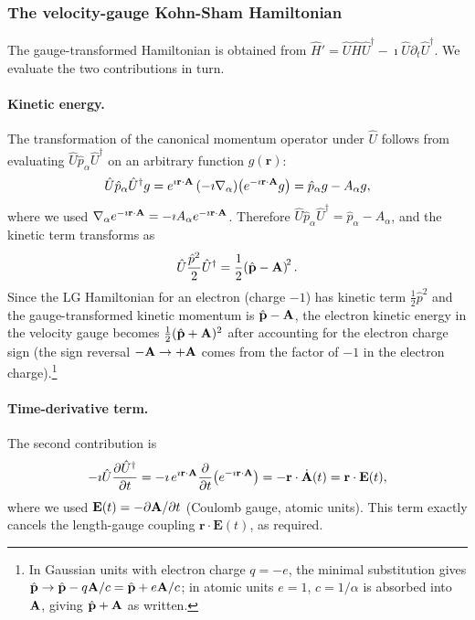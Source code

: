 \subsubsection{The velocity-gauge Kohn-Sham Hamiltonian}
\label{sec:H-VG}

The gauge-transformed Hamiltonian is obtained from
$\hat{H}' = \hat{U}\hat{H}\hat{U}^\dagger
- \imath\hat{U}\partial_t\hat{U}^\dagger$.
We evaluate the two contributions in turn.

\paragraph{Kinetic energy.}
The transformation of the canonical momentum operator under $\hat{U}$
follows from evaluating $\hat{U}\hat{p}_\alpha\hat{U}^\dagger$
on an arbitrary function $g(\mathbf{r})$:
\begin{equation}
  \hat{U}\hat{p}_\alpha\hat{U}^\dagger g
  = e^{\imath\mathbf{r}\cdot\mathbf{A}}\,(-\imath\nabla_\alpha)
    \!\left(e^{-\imath\mathbf{r}\cdot\mathbf{A}}g\right)
  = \hat{p}_\alpha g - A_\alpha g,
  \label{eq:U-p-Udag}
\end{equation}
where we used $\nabla_\alpha e^{-\imath\mathbf{r}\cdot\mathbf{A}}
= -\imath A_\alpha e^{-\imath\mathbf{r}\cdot\mathbf{A}}$.
Therefore $\hat{U}\hat{p}_\alpha\hat{U}^\dagger = \hat{p}_\alpha - A_\alpha$,
and the kinetic term transforms as
\begin{equation}
  \hat{U}\frac{\hat{p}^2}{2}\hat{U}^\dagger
  = \frac{1}{2}\!\left(\hat{\mathbf{p}} - \mathbf{A}\right)^{\!2}.
  \label{eq:U-T-Udag}
\end{equation}
Since the LG Hamiltonian for an electron (charge $-1$) has kinetic
term $\frac{1}{2}\hat{p}^2$ and the gauge-transformed kinetic
momentum is $\hat{\mathbf{p}} - \mathbf{A}$, the electron kinetic energy
in the velocity gauge becomes $\frac{1}{2}(\hat{\mathbf{p}} + \mathbf{A})^2$
after accounting for the electron charge sign
(the sign reversal $-\mathbf{A}\to+\mathbf{A}$ comes from the factor of $-1$
in the electron charge).\footnote{%
In Gaussian units with electron charge $q=-e$, the minimal substitution
gives $\hat{\mathbf{p}}\to\hat{\mathbf{p}}-q\mathbf{A}/c
=\hat{\mathbf{p}}+e\mathbf{A}/c$; in atomic units $e=1$, $c=1/\alpha$ is
absorbed into $\mathbf{A}$, giving $\hat{\mathbf{p}}+\mathbf{A}$ as written.}

\paragraph{Time-derivative term.}
The second contribution is
\begin{equation}
  -\imath\hat{U}\frac{\partial\hat{U}^\dagger}{\partial t}
  = -\imath\,e^{\imath\mathbf{r}\cdot\mathbf{A}}
    \frac{\partial}{\partial t}\!
    \left(e^{-\imath\mathbf{r}\cdot\mathbf{A}}\right)
  = -\mathbf{r}\cdot\dot{\mathbf{A}}(t)
  = \mathbf{r}\cdot\mathbf{E}(t),
  \label{eq:U-dt-Udag}
\end{equation}
where we used $\mathbf{E}(t) = -\partial\mathbf{A}/\partial t$
(Coulomb gauge, atomic units).
This term exactly cancels the length-gauge coupling
$\mathbf{r}\cdot\mathbf{E}(t)$, as required.

